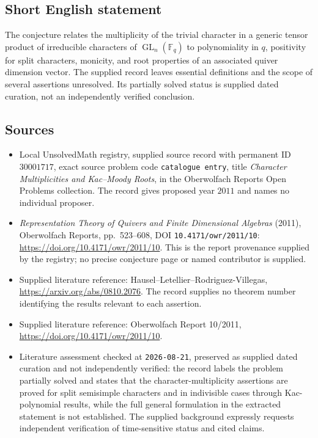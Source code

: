 \documentclass[11pt]{article}
\newcommand{\F}{\mathbb{F}}
\begin{document}
\subsection{Short English statement}
The conjecture relates the multiplicity of the trivial character in a generic tensor product of irreducible characters of \(\operatorname{GL}_n(\F_q)\) to polynomiality in \(q\), positivity for split characters, monicity, and root properties of an associated quiver dimension vector. The supplied record leaves essential definitions and the scope of several assertions unresolved. Its partially solved status is supplied dated curation, not an independently verified conclusion.
\subsection{Sources}
\begin{itemize}
\item Local UnsolvedMath registry, supplied source record with permanent ID \(30001717\), exact source problem code \texttt{catalogue entry}, title \emph{Character Multiplicities and Kac--Moody Roots}, in the Oberwolfach Reports Open Problems collection. The record gives proposed year \(2011\) and names no individual proposer.
\item \emph{Representation Theory of Quivers and Finite Dimensional Algebras} (2011), Oberwolfach Reports, pp.\ 523--608, DOI \texttt{10.4171/owr/2011/10}: \url{https://doi.org/10.4171/owr/2011/10}. This is the report provenance supplied by the registry; no precise conjecture page or named contributor is supplied.
\item Supplied literature reference: Hausel--Letellier--Rodriguez-Villegas, \url{https://arxiv.org/abs/0810.2076}. The record supplies no theorem number identifying the results relevant to each assertion.
\item Supplied literature reference: Oberwolfach Report 10/2011, \url{https://doi.org/10.4171/owr/2011/10}.
\item Literature assessment checked at \texttt{2026-08-21}, preserved as supplied dated curation and not independently verified: the record labels the problem partially solved and states that the character-multiplicity assertions are proved for split semisimple characters and in indivisible cases through Kac-polynomial results, while the full general formulation in the extracted statement is not established. The supplied background expressly requests independent verification of time-sensitive status and cited claims.
\end{itemize}
\end{document}
